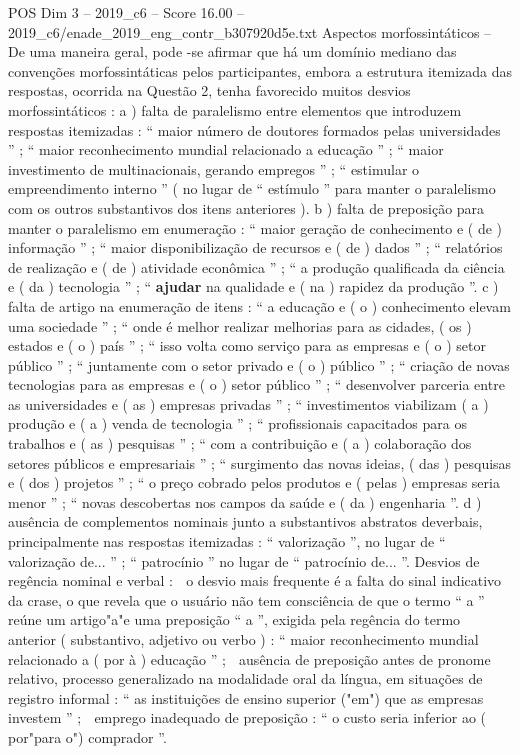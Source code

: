 \begin{textsample}{POS Dim 3 – 2019\_c6 – Score 16.00 – 2019\_c6/enade\_2019\_eng\_contr\_b307920d5e.txt}
Aspectos morfossintáticos – De uma maneira geral, pode -se afirmar que há um domínio mediano das convenções morfossintáticas pelos participantes, embora a estrutura itemizada das respostas, ocorrida na Questão 2, tenha favorecido muitos desvios morfossintáticos : a ) falta de paralelismo entre elementos que introduzem respostas itemizadas : “ maior número de doutores formados pelas universidades ” ; “ maior reconhecimento mundial relacionado a educação ” ; “ maior investimento de multinacionais, gerando empregos ” ; “ estimular o empreendimento interno ” ( no lugar de “ estímulo ” para manter o paralelismo com os outros substantivos dos itens anteriores ). b ) falta de preposição para manter o paralelismo em enumeração : “ maior geração de conhecimento e ( de ) informação ” ; “ maior disponibilização de recursos e ( de ) dados ” ; “ relatórios de realização e ( de ) atividade econômica ” ; “ a produção qualificada da ciência e ( da ) tecnologia ” ; “ \textbf{ajudar} na qualidade e ( na ) rapidez da produção ”. c ) falta de artigo na enumeração de itens : “ a educação e ( o ) conhecimento elevam uma sociedade ” ; “ onde é melhor realizar melhorias para as cidades, ( os ) estados e ( o ) país ” ; “ isso volta como serviço para as empresas e ( o ) setor público ” ; “ juntamente com o setor privado e ( o ) público ” ; “ criação de novas tecnologias para as empresas e ( o ) setor público ” ; “ desenvolver parceria entre as universidades e ( as ) empresas privadas ” ; “ investimentos viabilizam ( a ) produção e ( a ) venda de tecnologia ” ; “ profissionais capacitados para os trabalhos e ( as ) pesquisas ” ; “ com a contribuição e ( a ) colaboração dos setores públicos e empresariais ” ; “ surgimento das novas ideias, ( das ) pesquisas e ( dos ) projetos ” ; “ o preço cobrado pelos produtos e ( pelas ) empresas seria menor ” ; “ novas descobertas nos campos da saúde e ( da ) engenharia ”. d ) ausência de complementos nominais junto a substantivos abstratos deverbais, principalmente nas respostas itemizadas : “ valorização ”, no lugar de “ valorização de... ” ; “ patrocínio ” no lugar de “ patrocínio de... ”.
Desvios de regência nominal e verbal :  o desvio mais frequente é a falta do sinal indicativo da crase, o que revela que o usuário não tem consciência de que o termo “ a ” reúne um artigo"a"e uma preposição “ a ”, exigida pela regência do termo anterior ( substantivo, adjetivo ou verbo ) : “ maior reconhecimento mundial relacionado a ( por à ) educação ” ;  ausência de preposição antes de pronome relativo, processo generalizado na modalidade oral da língua, em situações de registro informal : “ as instituições de ensino superior ("em") que as empresas investem ” ;  emprego inadequado de preposição : “ o custo seria inferior ao ( por"para o") comprador ”.

\end{textsample}
